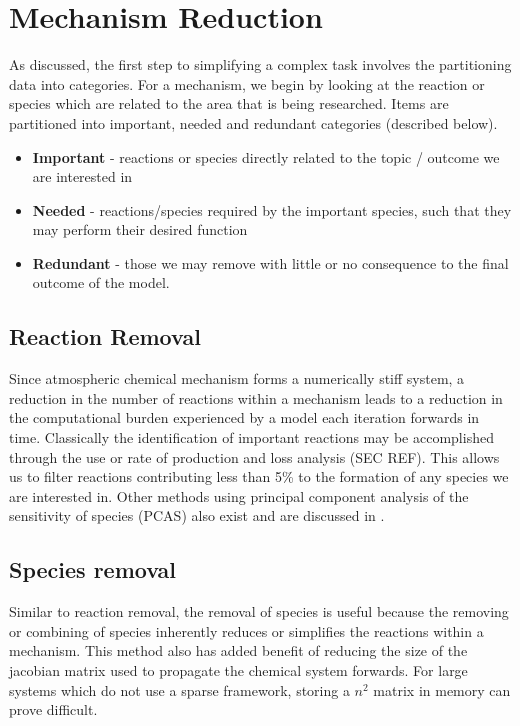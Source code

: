 \section{Mechanism Reduction}

As discussed, the first step to simplifying a complex task involves the partitioning data into categories. For a mechanism, we begin by looking at the reaction or species which are related to the area that is being researched. Items are partitioned into important, needed and redundant categories (described below). 

\begin{itemize}
    \item \textbf{Important} - reactions or species directly related to the topic / outcome we are interested in
    \item \textbf{Needed} - reactions/species required by the important species, such that they may perform their desired function
    \item \textbf{Redundant} - those we may remove with little or no consequence to the final outcome of the model. 
\end{itemize}



\subsection{Reaction Removal}
Since atmospheric chemical mechanism forms a numerically stiff system, a reduction in the number of reactions within a mechanism leads to a reduction in the computational burden experienced by a model each iteration forwards in time. Classically the identification of important reactions may be accomplished through the use or rate of production and loss analysis (SEC REF). This allows us to filter reactions contributing less than 5\% to the formation of any species we are interested in. Other methods using principal component analysis of the sensitivity of species (PCAS) also exist and are discussed in \cite{PCAS}.


\subsection{Species removal}
Similar to reaction removal, the removal of species is useful because the removing or combining of species inherently reduces or simplifies the reactions within a mechanism.  This method also has added benefit of reducing the size of the jacobian matrix used to propagate the chemical system forwards. For large systems which do not use a sparse framework, storing a $n^2$ matrix in memory can prove difficult.

